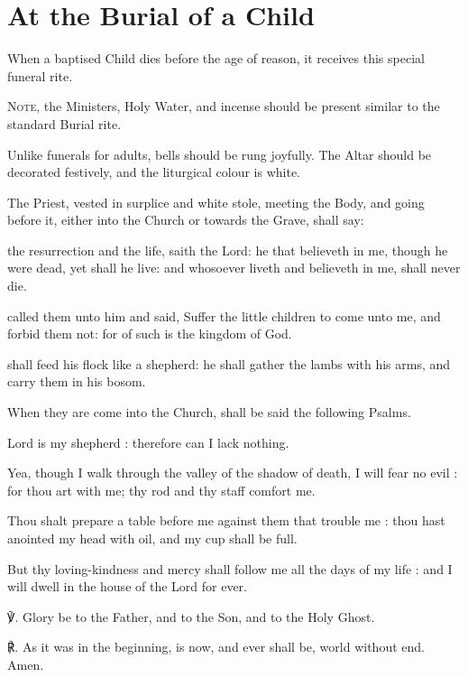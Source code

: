 \fancyhead[RE,LO]{\textit{}}
\section{At the Burial of a Child}
\begin{rubric}
    When a baptised Child dies before the age of reason, it receives this special funeral rite.\par
    \textsc{Note,} the Ministers, Holy Water, and incense should be present similar to the standard Burial rite.
\end{rubric}
\begin{rubric}
    Unlike funerals for adults, bells should be rung joyfully. The Altar should be decorated festively, and the liturgical colour is white.
\end{rubric}
\begin{rubric}
    The Priest, vested in surplice and white stole, meeting the Body, and going before it, either into the Church or towards the Grave, shall say:
\end{rubric}
 the resurrection and the life, saith the Lord: he that believeth in me, though he were dead, yet shall he live: and whosoever liveth and believeth in me, shall never die.

 called them unto him and said, Suffer the little children to come unto me, and forbid them not: for of such is the kingdom of God.\par
\vspace{2ex}
 shall feed his flock like a shepherd: he shall gather the lambs with his arms, and carry them in his bosom.

\begin{rubric}
    When they are come into the Church, shall be said the following Psalms.
\end{rubric}

 Lord is my shepherd : therefore can I lack nothing.\par
{}
Yea, though I walk through the valley of the shadow of death, I will fear no evil : for thou art with me; thy rod and thy staff comfort me.\par
{}Thou shalt prepare a table before me against them that trouble me : thou hast anointed my head with oil, and my cup shall be full.\par
{}But thy loving-kindness and mercy shall follow me all the days of my life : and I will dwell in the house of the Lord for ever.\par
℣. Glory be to the Father, and to the Son, and to the Holy Ghost.\par
℟. As it was in the beginning, is now, and ever shall be, world without end. Amen.

